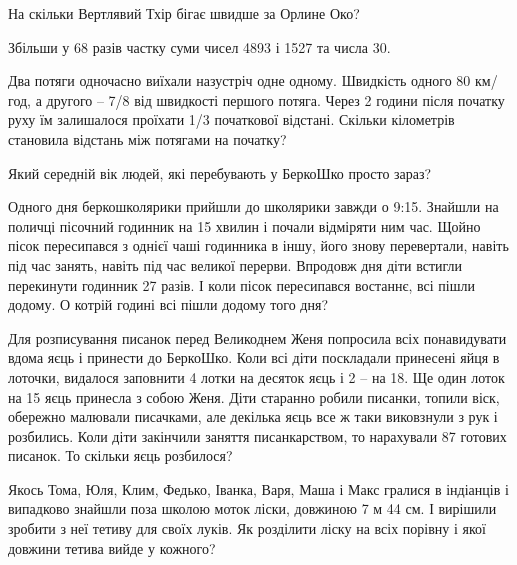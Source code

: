 На скільки Вертлявий Тхір бігає швидше за Орлине Око?


\problem
Збільши у 68 разів частку суми чисел 4893 і 1527 та числа 30.


\problem
Два потяги одночасно виїхали назустріч одне одному.
Швидкість одного 80 км/год, а другого – 7/8 від швидкості першого потяга.
Через 2 години після початку руху їм залишалося проїхати
1/3 початкової відстані.
Скільки кілометрів становила відстань між потягами на початку?


\problem
Який середній вік людей, які перебувають у БеркоШко просто зараз?


\problem
Одного дня беркошколярики прийшли до школярики завжди о 9:15.
Знайшли на поличці пісочний годинник на 15 хвилин і почали відміряти ним час.
Щойно пісок пересипався з однієї чаші годинника в іншу,
його знову перевертали, навіть під час занять,
навіть під час великої перерви.
Впродовж дня діти встигли перекинути годинник 27 разів.
І коли пісок пересипався востаннє, всі пішли додому.
О котрій годині всі пішли додому того дня?


\problem
Для розписування писанок перед Великоднем Женя попросила всіх понавидувати
вдома яєць і принести до БеркоШко. Коли всі діти поскладали принесені яйця
в лоточки, видалося заповнити 4 лотки на десяток яєць і 2 – на 18.
Ще один лоток на 15 яєць принесла з собою Женя.
Діти старанно робили писанки, топили віск, обережно малювали писачками,
але декілька яєць все ж таки виковзнули з рук і розбились.
Коли діти закінчили заняття писанкарством, то нарахували 87 готових писанок.
То скільки яєць розбилося?


\problem
Якось Тома, Юля, Клим, Федько, Іванка, Варя, Маша і Макс гралися
в індіанців і випадково знайшли поза школою моток ліски, довжиною 7 м 44 см.
І вирішили зробити з неї тетиву для своїх луків.
Як розділити ліску на всіх порівну і якої довжини тетива вийде у кожного?
